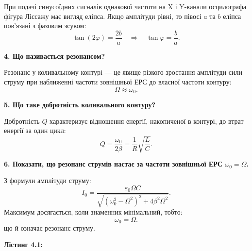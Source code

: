 \documentclass[12pt,a4paper]{article}
\begin{document}
    При подачі синусоїдних сигналів однакової частоти на X і Y-канали осцилографа фігура Ліссажу має вигляд еліпса. Якщо амплітуди рівні, то півосі \( a \) та \( b \) еліпса пов’язані з фазовим зсувом:
    \[
    \tan(2\varphi) = \frac{2b}{a} \quad \Rightarrow \quad \tan\varphi = \frac{b}{a}.
    \]

    \vspace{1em}

    \textbf{4. Що називається резонансом?}

    Резонанс у коливальному контурі — це явище різкого зростання амплітуди сили струму при наближенні частоти зовнішньої ЕРС до власної частоти контуру:
    \[
    \Omega \approx \omega_0.
    \]

    \vspace{1em}

    \textbf{5. Що таке добротність коливального контуру?}

    Добротність \( Q \) характеризує відношення енергії, накопиченої в контурі, до втрат енергії за один цикл:
    \[
    Q = \frac{\omega_0}{2\beta} = \frac{1}{R} \sqrt{\frac{L}{C}}.
    \]

    \vspace{1em}

    \textbf{6. Показати, що резонанс струмів настає за частоти зовнішньої ЕРС \( \omega_0 = \Omega \).}

    З формули амплітуди струму:
    \[
    I_0 = \frac{\varepsilon_0 \Omega C}{\sqrt{(\omega_0^2 - \Omega^2)^2 + 4\beta^2 \Omega^2}}.
    \]
    Максимум досягається, коли знаменник мінімальний, тобто:
    \[
    \omega_0 = \Omega.
    \]
    що й означає резонанс струму.

    \newpage

    \hypertarget{listing1}{}

    \textbf{\large Лістинг 4.1:}

    \vspace{1em}
\end{document}
